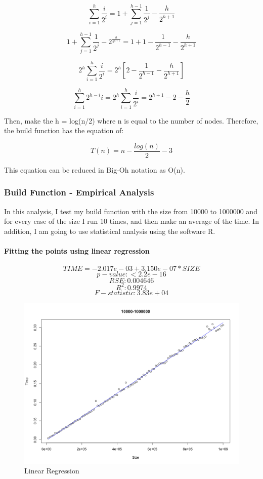 \documentclass[14pt, oneside]{article}
\begin{document}
$$\sum_{i=1}^{h} \frac{i}{2^{i}}  = 1 + \sum_{j=1}^{h-1} \frac{1}{2^{j}}  - \frac{h}{2^{h+1}}$$

$$1 + \sum_{j=1}^{h-1} \frac{1}{2^{j}}  - 2^{\frac{h}{2^{h+1}}} = 1 + 1 - \frac{1}{2^{h-1}}  - \frac{h}{2^{h+1}}$$

$$ 2^{h} \sum_{i=1}^{h} \frac{i}{2^{i}} = 2^{h} [2 - \frac{1}{2^{h-1}}  - \frac{h}{2^{h+1}} ]$$

$$\sum_{i=1}^{h} 2^{h-i} i =  2^{h} \sum_{i=1}^{h} \frac{i}{2^{i}} = 2^{h+1} - 2 - \frac{h}{2} $$

Then, make the h = log(n/2) where n is equal to the number of nodes. Therefore, the build function has the equation of:

$$T(n) = n - \frac{log(n)}{2} - 3 $$

This equation can be reduced in Big-Oh notation as O(n).


\subsubsection{Build Function - Empirical Analysis}

In this analysis, I test my build function with the size from 10000 to 1000000 and for every case of the size I run 10 times, and then make an average of the time. In addition, I am going to use statistical analysis using the software R.

\paragraph{Fitting the points using linear regression}

$$ TIME = -2.017e-03 + 3.150e-07*SIZE $$
$$ p-value: < 2.2e-16 $$
$$ RSE: 0.004646 $$
$$ R^{2}:  0.9974 $$
$$ F-statistic: 3.83e+04 $$

\begin{figure}[H]
\centering
\includegraphics[width=\linewidth]{Rplot.png}
\caption{Linear Regression}
\end{figure}
\end{document}
